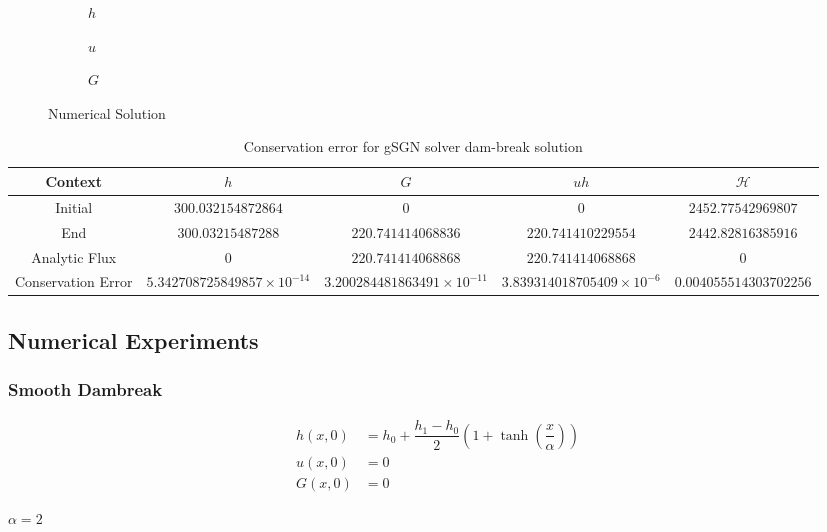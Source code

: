 \documentclass[10pt]{article}
\begin{document}
\begin{figure}
	\centering
	\begin{subfigure}{0.49\textwidth}
		\centering
		
		\caption{$h$}
	\end{subfigure}
	\begin{subfigure}{0.49\textwidth}
		\centering
		
		\caption{$u$}
	\end{subfigure}
	\begin{subfigure}{0.49\textwidth}
		\centering
		
		\caption{$G$}
	\end{subfigure}
	\caption{Numerical Solution}
\end{figure}
\begin{table}
\begin{tabular}{c c c c c}
Context	 & $h$ & $G$ & $uh$ & $\mathcal{H}$ \\
\hline
Initial	& $300.032154872864$ & $0$ & $0$ & $2452.77542969807$ \\
End	& $300.03215487288$ & $220.741414068836$ & $220.741410229554$ & $2442.82816385916$ \\
Analytic Flux & $0$ & $220.741414068868$& $220.741414068868$ & $0$ \\
Conservation Error &  $5.342708725849857 \times 10^{-14}$ & $3.200284481863491\times 10^{-11}$ 
 & $3.839314018705409\times 10^{-6}$ & $0.004055514303702256$
\end{tabular}
\caption{Conservation error for gSGN solver dam-break solution}
\end{table}


\subsection{Numerical Experiments}

\subsubsection{Smooth Dambreak}

\begin{align}
h(x,0) & = h_0 + \dfrac{h_1 - h_0}{2} \left(1 + \tanh\left(\dfrac{x}{\alpha}\right)\right)  \\
u(x,0) &= 0 \\
G(x,0) &= 0
\end{align}

$\alpha = 2$
\end{document}
